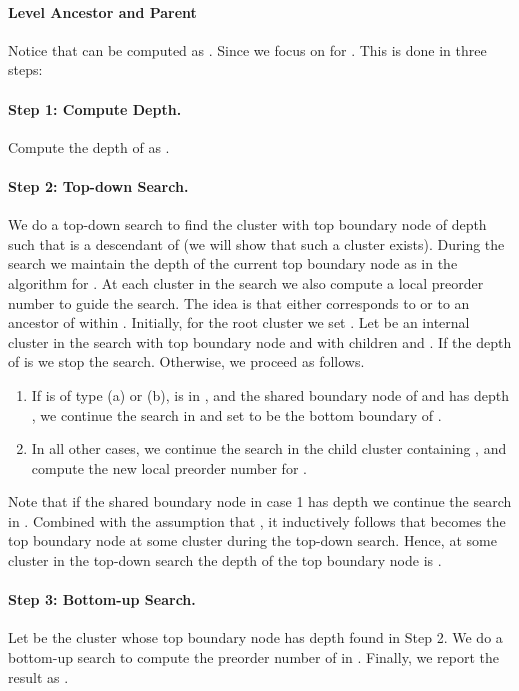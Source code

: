 \documentclass [11pt]{article}
\begin{document}
\paragraph{Level Ancestor and Parent}
Notice that  can be computed as . Since  we focus on    for . This is done in three steps:

\paragraph{Step 1: Compute Depth.} Compute the depth of  as 
. 

\paragraph{Step 2: Top-down Search.} We do a top-down search to find the cluster with top boundary node  of depth  such that  is a descendant of  (we will show that such a cluster exists). During the search we maintain the depth of the current top boundary node as in the algorithm for . At each cluster  in the search we also compute a local preorder number  to guide the search. The idea is that  either corresponds to  or to an ancestor of  within . Initially, for the root cluster  we set . Let  be an internal cluster in the search with top boundary node  and with children  and . If the depth of  is  we stop the search. Otherwise, we proceed as follows.
\begin{enumerate}
\item If  is of type (a) or (b),  is in , and the shared boundary node of  and  has depth , we continue the search in  and set  to be the bottom boundary of . 
\item In all other cases, we continue the search in the child cluster containing , and compute the new local preorder number for . 
\end{enumerate}
Note that if the shared boundary node in case 1 has depth  we continue the search in . Combined with the assumption that , it inductively follows that  becomes the top boundary node at some cluster during the top-down search. Hence, at some cluster in the top-down search the depth of the top boundary node is . 

\paragraph{Step 3: Bottom-up Search.} Let  be the cluster whose top boundary node  has depth  found in Step 2. We do a bottom-up search to compute the preorder number of  in . Finally, we report the result as . 
\end{document}
